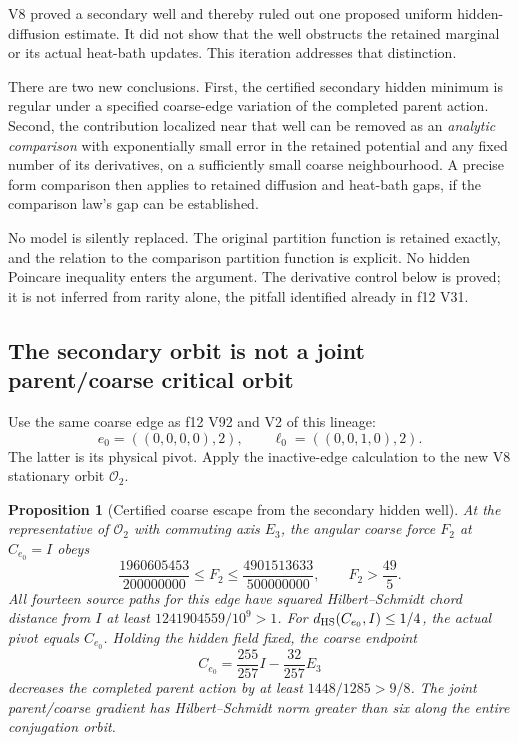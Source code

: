 \documentclass[11pt,oneside]{article}
\newtheorem{proposition}[theorem]{Proposition}
\begin{document}
V8 proved a secondary well and thereby ruled out
one proposed uniform hidden-diffusion estimate.
It did not show that the well obstructs the
retained marginal or its actual heat-bath updates.
This iteration addresses that distinction.

There are two new conclusions. First, the
certified secondary hidden minimum is regular
under a specified coarse-edge variation of the
completed parent action. Second, the contribution
localized near that well can be removed as an
\emph{analytic comparison} with exponentially
small error in the retained potential and any
fixed number of its derivatives, on a sufficiently
small coarse neighbourhood. A precise form
comparison then applies to retained diffusion
and heat-bath gaps, if the comparison law's
gap can be established.

No model is silently replaced. The original
partition function is retained exactly, and
the relation to the comparison partition
function is explicit. No hidden Poincare
inequality enters the argument. The derivative
control below is proved; it is not inferred
from rarity alone, the pitfall identified
already in f12 V31.

\subsection{The secondary orbit is not a joint parent/coarse critical orbit}

Use the same coarse edge as f12 V92 and
V2 of this lineage:
\[
 e_0=((0,0,0,0),2),\qquad
 \ell_0=((0,0,1,0),2).
\]
The latter is its physical pivot. Apply
the inactive-edge calculation to the
new V8 stationary orbit \(\mathcal O_2\).

\begin{proposition}[Certified coarse escape from the secondary hidden well]
\label{prop:f13v9-coarse}
At the representative of \(\mathcal O_2\)
with commuting axis \(E_3\), the angular
coarse force \(F_2\) at \(C_{e_0}=I\) obeys
\[
 \frac{1960605453}{200000000}
 \le F_2\le
 \frac{4901513633}{500000000},\qquad
 F_2>\frac{49}{5}.
\]
All fourteen source paths for this edge
have squared Hilbert--Schmidt chord
distance from \(I\) at least
\(1241904559/10^9>1\).
For \(d_{\rm HS}(C_{e_0},I)\le1/4\),
the actual pivot equals \(C_{e_0}\).
Holding the hidden field fixed, the
coarse endpoint
\[
 C_{e_0}=\frac{255}{257}I
                       -\frac{32}{257}E_3
\]
decreases the completed parent action
by at least \(1448/1285>9/8\).
The joint parent/coarse gradient has
Hilbert--Schmidt norm greater than six
along the entire conjugation orbit.
\end{proposition}
\end{document}
